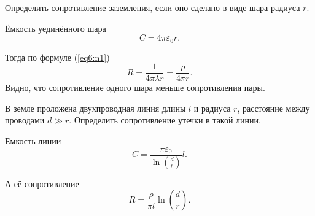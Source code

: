     \begin{example}
        Определить сопротивление заземления, если оно сделано в виде шара
        радиуса \( r \).
    \end{example}
    
    \begin{solution}
        Ёмкость уединённого шара
        \[
            C = 4\pi\varepsilon_0 r.
        \]
        
        Тогда по формуле (\ref{eq6:n1})
        \[
            R = \frac{1}{4\pi\lambda r} = \frac{\rho}{4\pi r}.
        \]
        Видно, что сопротивление одного шара меньше сопротивления пары.
    \end{solution}
    
    \begin{example}
        В земле проложена двухпроводная линия длины \( l \) и радиуса \( r \),
        расстояние между проводами \( d \gg r \). Определить сопротивление
        утечки в такой линии.
    \end{example}
    
    \begin{solution}
        Емкость линии
        \[
            C = \frac{\pi\varepsilon_0}{\ln\left(\frac{d}{r}\right)} l.
        \]
    
        А её сопротивление
        \[
            R = \frac{\rho}{\pi l}\ln\left(\frac{d}{r}\right).
        \]
    \end{solution}
